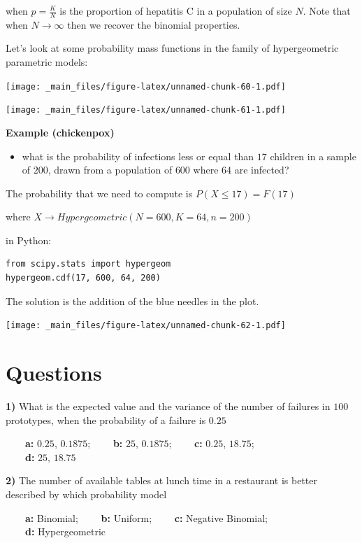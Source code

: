 \documentclass[
]{book}
\providecommand{\tightlist}{%
  \setlength{\itemsep}{0pt}\setlength{\parskip}{0pt}}
\begin{document}
when \(p=\frac{K}{N}\) is the proportion of hepatitis C in a population of size \(N\). Note that when \(N \rightarrow \infty\) then we recover the binomial properties.

Let's look at some probability mass functions in the family of hypergeometric parametric models:

\texttt{[image: \_main\_files/figure-latex/unnamed-chunk-60-1.pdf]}

\texttt{[image: \_main\_files/figure-latex/unnamed-chunk-61-1.pdf]}

\textbf{Example (chickenpox)}

\begin{itemize}
\tightlist
\item
  what is the probability of infections less or equal than \(17\) children in a sample of \(200\), drawn from a population of \(600\) where \(64\) are infected?
\end{itemize}

The probability that we need to compute is
\(P(X \leq 17)=F(17)\)

where \(X \rightarrow Hypergeometric(N=600,K=64,n=200)\)

in Python:

\begin{verbatim}
from scipy.stats import hypergeom
hypergeom.cdf(17, 600, 64, 200)
\end{verbatim}

The solution is the addition of the blue needles in the plot.

\texttt{[image: \_main\_files/figure-latex/unnamed-chunk-62-1.pdf]}

\hypertarget{questions-4}{%
\section{Questions}\label{questions-4}}

\textbf{1)} What is the expected value and the variance of the number of failures in \(100\) prototypes, when the probability of a failure is \(0.25\)

\textbf{\(\qquad\)a:} \(0.25\), \(0.1875\);
\textbf{\(\qquad\)b:} \(25\), \(0.1875\);
\textbf{\(\qquad\)c:} \(0.25\), \(18.75\);\\
\textbf{\(\qquad\)d:} \(25\), \(18.75\)

\textbf{2)} The number of available tables at lunch time in a restaurant is better described by which probability model

\textbf{\(\qquad\)a:} Binomial;
\textbf{\(\qquad\)b:} Uniform;
\textbf{\(\qquad\)c:} Negative Binomial;\\
\textbf{\(\qquad\)d:} Hypergeometric
\end{document}
